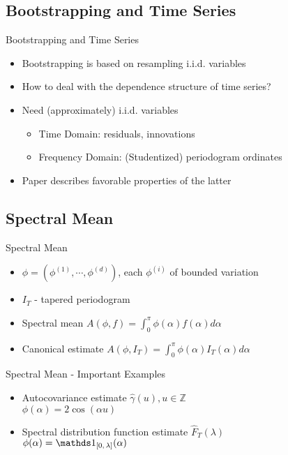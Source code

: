 
\subsection{Bootstrapping and Time Series}
\begin{frame}{Bootstrapping and Time Series}

\begin{itemize}
\item Bootstrapping is based on resampling i.i.d. variables

\item How to deal with the dependence structure of time series?

\item Need (approximately) i.i.d. variables
\begin{itemize}
\item Time Domain: residuals, innovations
\item Frequency Domain: (Studentized) periodogram ordinates
\end{itemize}

\item Paper describes favorable properties of the latter

\end{itemize}
\end{frame}



\subsection{Spectral Mean}
\begin{frame}{Spectral Mean}
\begin{itemize}

\item $\phi = (\phi^{(1)},\cdots,\phi^{(d)})$, each $\phi^{(i)}$ of bounded variation

\item $I_T$ - tapered periodogram

\item Spectral mean $A(\phi, f) = \int_0^\pi \phi(\alpha)f(\alpha)d\alpha$

\item Canonical estimate $A(\phi,I_T) = \int_0^\pi \phi(\alpha)I_T(\alpha)d\alpha$

\end{itemize}
\end{frame}



\begin{frame}{Spectral Mean - Important Examples}
\begin{itemize}

\item Autocovariance estimate $\hat{\gamma}(u), u \in \mathbb{Z}$\\
$\phi(\alpha) = 2\cos(\alpha u)$

\item Spectral distribution function estimate $\hat{F}_T(\lambda)$\\
$\phi(\alpha) = \on{[0,\lambda]}(\alpha)$

\end{itemize}
\end{frame}



